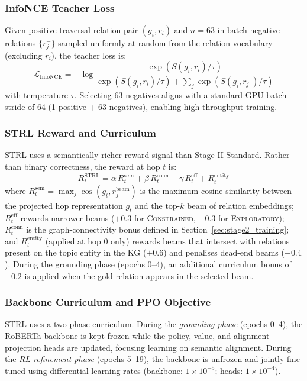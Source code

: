 \documentclass[10pt,conference]{IEEEtran}
\begin{document}
\subsubsection{InfoNCE Teacher Loss}

Given positive traversal-relation pair $(g_i, r_i)$ and $n{=}63$ in-batch negative relations $\{r_j^-\}$ sampled uniformly at random from the relation vocabulary (excluding $r_i$), the teacher loss is:
\begin{equation}
\mathcal{L}_{\text{InfoNCE}} = -\log \frac{\exp(S(g_i,r_i)/\tau)}{\exp(S(g_i,r_i)/\tau) + \sum_j \exp(S(g_i,r_j^-)/\tau)}
\end{equation}
with temperature $\tau$. Selecting 63 negatives aligns with a standard GPU batch stride of 64 (1 positive + 63 negatives), enabling high-throughput training.

\subsubsection{STRL Reward and Curriculum}

STRL uses a semantically richer reward signal than Stage II Standard. Rather than binary correctness, the reward at hop $t$ is:
\begin{equation}
R^{\text{STRL}}_t = \alpha\,R^{\text{sem}}_t + \beta\,R^{\text{conn}}_t + \gamma\,R^{\text{eff}}_t + R^{\text{entity}}_t
\end{equation}
where $R^{\text{sem}}_t = \max_j \cos(g_t, r_j^{\text{beam}})$ is the maximum cosine similarity between the projected hop representation $g_t$ and the top-$k$ beam of relation embeddings; $R^{\text{eff}}_t$ rewards narrower beams ($+0.3$ for \textsc{Constrained}, $-0.3$ for \textsc{Exploratory}); $R^{\text{conn}}_t$ is the graph-connectivity bonus defined in Section~\ref{sec:stage2_training}; and $R^{\text{entity}}_t$ (applied at hop 0 only) rewards beams that intersect with relations present on the topic entity in the KG ($+0.6$) and penalises dead-end beams ($-0.4$). During the grounding phase (epochs 0--4), an additional curriculum bonus of $+0.2$ is applied when the gold relation appears in the selected beam.

\subsubsection{Backbone Curriculum and PPO Objective}

STRL uses a two-phase curriculum. During the \emph{grounding phase} (epochs 0--4), the RoBERTa backbone is kept frozen while the policy, value, and alignment-projection heads are updated, focusing learning on semantic alignment. During the \emph{RL refinement phase} (epochs 5--19), the backbone is unfrozen and jointly fine-tuned using differential learning rates (backbone: $1\times10^{-5}$; heads: $1\times10^{-4}$).
\end{document}
